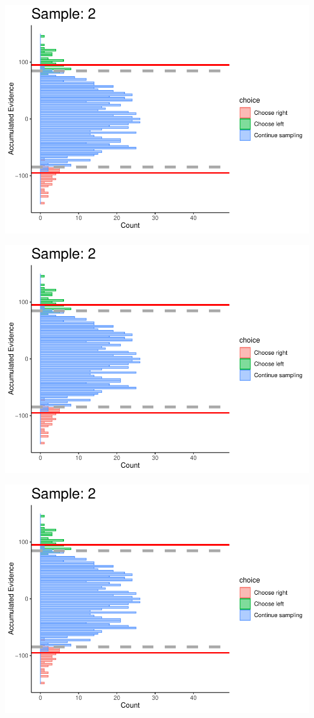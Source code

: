 \documentclass[
]{book}
\begin{document}
\begin{center}\includegraphics[width=0.8\linewidth]{LateNightBayes_files/figure-latex/collapsing_dcb-14} \end{center}

\begin{center}\includegraphics[width=0.8\linewidth]{LateNightBayes_files/figure-latex/collapsing_dcb-15} \end{center}

\begin{center}\includegraphics[width=0.8\linewidth]{LateNightBayes_files/figure-latex/collapsing_dcb-16} \end{center}
\end{document}
